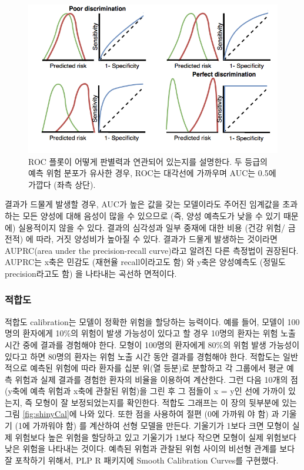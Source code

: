 \documentclass[11pt]{book}
\theoremstyle{definition}
\theoremstyle{definition}
\theoremstyle{definition}
\theoremstyle{remark}
\begin{document}
\begin{figure}
\includegraphics[width=1\linewidth]{images/PatientLevelPrediction/theory/roctheory} \caption{ROC 플롯이 어떻게 판별력과 연관되어 있는지를 설명한다. 두 등급의 예측 위험 분포가 유사한 경우, ROC는 대각선에 가까우며 AUC는 0.5에 가깝다 (좌측 상단).}\label{fig:figuretheoryroctheory}
\end{figure}

결과가 드물게 발생할 경우, AUC가 높은 값을 갖는 모델이라도 주어진
임계값을 초과하는 모든 양성에 대해 음성이 많을 수 있으므로 (즉, 양성
예측도가 낮을 수 있기 때문에) 실용적이지 않을 수 있다. 결과의 심각성과
일부 중재에 대한 비용 (건강 위험/ 금전적) 에 따라, 거짓 양성비가 높아질
수 있다. 결과가 드물게 발생하는 것이라면 AUPRC(area under the
precision-recall curve)라고 알려진 다른 측정법이 권장된다. AUPRC는 x축은
민감도 (재현율 recall이라고도 함) 와 y축은 양성예측도 (정밀도
precision라고도 함) 을 나타내는 곡선하 면적이다.

\subsubsection*{적합도}

적합도 calibration는 모델이 정확한 위험을 할당하는 능력이다. 예를 들어,
모델이 100명의 환자에게 10\%의 위험이 발생 가능성이 있다고 할 경우
10명의 환자는 위험 노출 시간 중에 결과를 경험해야 한다. 모형이 100명의
환자에게 80\%의 위험 발생 가능성이 있다고 하면 80명의 환자는 위험 노출
시간 동안 결과를 경험해야 한다. 적합도는 일반적으로 예측된 위험에 따라
환자를 십분 위(열 등분)로 분할하고 각 그룹에서 평균 예측 위험과 실제
결과를 경험한 환자의 비율을 이용하여 계산한다. 그런 다음 10개의 점
(y축에 예측 위험과 x축에 관찰된 위험)을 그린 후 그 점들이 x = y인 선에
가까이 있는지, 즉 모형이 잘 보정되었는지를 확인한다. 적합도 그래프는 이
장의 뒷부분에 있는 그림 \ref{fig:shinyCal}에 나와 있다. 또한 점을
사용하여 절편 (0에 가까워 야 함) 과 기울기 (1에 가까워야 함) 를 계산하여
선형 모델을 만든다. 기울기가 1보다 크면 모형이 실제 위험보다 높은 위험을
할당하고 있고 기울기가 1보다 작으면 모형이 실제 위험보다 낮은 위험을
나타내는 것이다. 예측된 위험과 관찰된 위험 사이의 비선형 관계를 보다 잘
포착하기 위해서, PLP R 패키지에 Smooth Calibration Curves를 구현했다.
\end{document}
